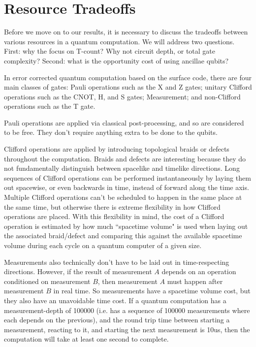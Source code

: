 \documentclass[twocolumn]{quantumarticle-customized}
\begin{document}
\section*{Resource Tradeoffs}

Before we move on to our results, it is necessary to discuss the tradeoffs between various resources in a quantum computation.
We will address two questions.
First: why the focus on T-count?
Why not circuit depth, or total gate complexity?
Second: what is the opportunity cost of using ancillae qubits?

In error corrected quantum computation based on the surface code, there are four main classes of gates: Pauli operations such as the X and Z gates; unitary Clifford operations such as the CNOT, H, and S gates; Measurement; and non-Clifford operations such as the T gate.

Pauli operations are applied via classical post-processing, and so are considered to be free.
They don't require anything extra to be done to the qubits.

Clifford operations are applied by introducing topological braids or defects throughout the computation.
Braids and defects are interesting because they do not fundamentally distinguish between spacelike and timelike directions.
Long sequences of Clifford operations can be performed instantaneously by laying them out spacewise, or even backwards in time, instead of forward along the time axis.
Multiple Clifford operations can't be scheduled to happen in the same place at the same time, but otherwise there is extreme flexibility in how Clifford operations are placed.
With this flexibility in mind, the cost of a Clifford operation is estimated by how much ``spacetime volume" is used when laying out the associated braid/defect and comparing this against the available spacetime volume during each cycle on a quantum computer of a given size.

Measurements also technically don't have to be laid out in time-respecting directions.
However, if the result of measurement $A$ depends on an operation conditioned on measurement $B$, then measurement $A$ must happen after measurement $B$ in real time.
So measurements have a spacetime volume cost, but they also have an unavoidable time cost.
If a quantum computation has a measurement-depth of 100000 (i.e. has a sequence of 100000 measurements where each depends on the previous), and the round trip time between starting a measurement, reacting to it, and starting the next measurement is 10us, then the computation will take at least one second to complete.
\end{document}
